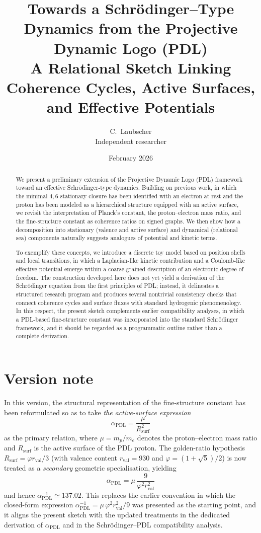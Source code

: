 \documentclass[11pt,a4paper]{article}
\title{Towards a Schr\"odinger--Type Dynamics from the Projective Dynamic Logo (PDL)\\
A Relational Sketch Linking Coherence Cycles, Active Surfaces, and Effective Potentials}
\author{C.\ Laubscher\\
{\small Independent researcher}}
\date{February 2026}
\begin{document}
\maketitle

\begin{abstract}
We present a preliminary extension of the Projective Dynamic Logo (PDL) framework toward an effective Schrödinger-type dynamics. Building on previous work, in which the minimal $4,6$ stationary closure has been identified with an electron at rest and the proton has been modeled as a hierarchical structure equipped with an active surface, we revisit the interpretation of Planck’s constant, the proton–electron mass ratio, and the fine-structure constant as coherence ratios on signed graphs. We then show how a decomposition into stationary (valence and active surface) and dynamical (relational sea) components naturally suggests analogues of potential and kinetic terms. 

To exemplify these concepts, we introduce a discrete toy model based on position shells and local transitions, in which a Laplacian-like kinetic contribution and a Coulomb-like effective potential emerge within a coarse-grained description of an electronic degree of freedom. The construction developed here does not yet yield a derivation of the Schrödinger equation from the first principles of PDL; instead, it delineates a structured research program and produces several nontrivial consistency checks that connect coherence cycles and surface fluxes with standard hydrogenic phenomenology. In this respect, the present sketch complements earlier compatibility analyses, in which a PDL-based fine-structure constant was incorporated into the standard Schrödinger framework, and it should be regarded as a programmatic outline rather than a complete derivation.
\end{abstract}

\section*{Version note}
In this version, the structural representation of the fine-structure constant has been reformulated so as to take 
\emph{the active-surface expression} 
\[
\alpha_{\mathrm{PDL}} = \frac{\mu}{R_{\mathrm{surf}}^{2}}
\]
as the primary relation, where $\mu = m_p/m_e$ denotes the proton–electron mass ratio and $R_{\mathrm{surf}}$ is the active surface of the PDL proton.
The golden-ratio hypothesis $R_{\mathrm{surf}} = \varphi r_{\mathrm{val}}/3$ (with valence content $r_{\mathrm{val}}=930$ and $\varphi = (1+\sqrt{5})/2$) is now treated as a \emph{secondary} geometric specialisation, yielding
\[
\alpha_{\mathrm{PDL}} = \mu\,\frac{9}{\varphi^{2} r_{\mathrm{val}}^{2}}
\]
and hence $\alpha_{\mathrm{PDL}}^{-1} \simeq 137.02$.
This replaces the earlier convention in which the closed-form expression 
$\alpha_{\mathrm{PDL}}^{-1} = \mu\,\varphi^{2} r_{\mathrm{val}}^{2}/9$ was presented as the starting point,
and it aligns the present sketch with the updated treatments in the dedicated derivation of $\alpha_{\mathrm{PDL}}$ and in the Schrödinger–PDL compatibility analysis.
\end{document}
